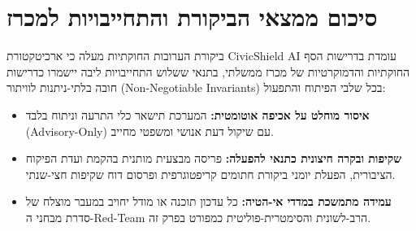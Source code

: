 \section{סיכום ממצאי הביקורת והתחייבויות למכרז}
\label{sec:safeguards_summary}

ביקורת הערובות החוקתיות מעלה כי ארכיטקטורת \textenglish{CivicShield AI} עומדת בדרישות הסף החוקתיות והדמוקרטיות של מכרז ממשלתי, בתנאי ששלוש התחייבויות ליבה יישמרו כדרישות חובה בלתי-ניתנות לוויתור (\textenglish{Non-Negotiable Invariants}) בכל שלבי הפיתוח והתפעול:
\begin{itemize}
    \item \textbf{איסור מוחלט על אכיפה אוטומטית:} המערכת תישאר כלי התרעה וניתוח בלבד (\textenglish{Advisory-Only}) עם שיקול דעת אנושי ומשפטי מחייב.
    \item \textbf{שקיפות ובקרה חיצונית כתנאי להפעלה:} פריסה מבצעית מותנית בהקמת ועדת הפיקוח הציבורית, הפעלת יומני ביקורת חתומים קריפטוגרפית ופרסום דוח שקיפות חצי-שנתי.
    \item \textbf{עמידה מתמשכת במדדי אי-הטיה:} כל עדכון תוכנה או מודל יחויב במעבר מוצלח של סדרת מבחני ה-\textenglish{Red-Team} הרב-לשונית והסימטרית-פוליטית כמפורט בפרק זה.
\end{itemize}
